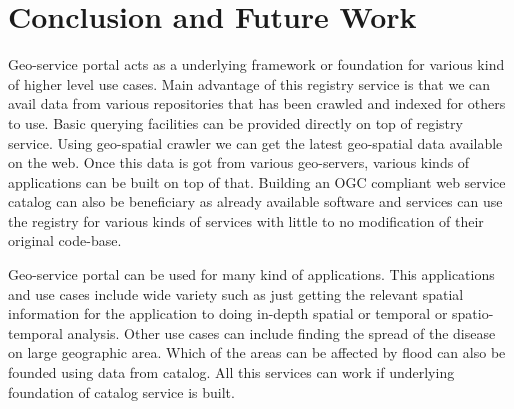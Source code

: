 \chapter{Conclusion and Future Work}

Geo-service portal acts as a underlying framework or foundation for various kind of higher level use cases. Main advantage of this registry service is that we can avail data from various repositories that has been crawled and indexed for others to use. Basic querying facilities can be provided directly on top of registry service. Using geo-spatial crawler we can get the latest geo-spatial data available on the web. Once this data is got from various geo-servers, various kinds of applications can be built on top of that. Building an OGC compliant web service catalog can also be beneficiary as already available software and services can use the registry for various kinds of services with little to no modification of their original code-base.
\newline
\par Geo-service portal can be used for many kind of applications. This applications and use cases include wide variety such as just getting the relevant spatial information for the application to doing in-depth spatial or temporal or spatio-temporal analysis. Other use cases can include finding the spread of the disease on large geographic area. Which of the areas can be affected by flood can also be founded using data from catalog. All this services can work if underlying foundation of catalog service is built.

